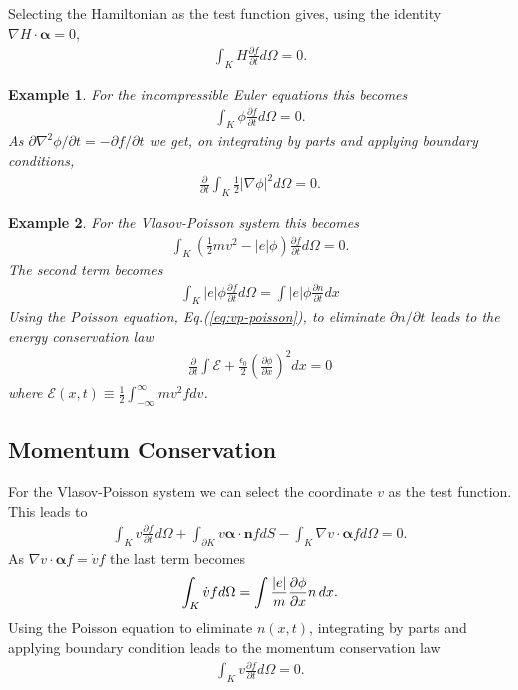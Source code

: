 \documentclass[11pt, reqno]{amsart}
\newcommand{\eqr}[1]{Eq.\thinspace(#1)}
\newcommand{\pfrac}[2]{\frac{\partial #1}{\partial #2}}
\newcommand{\pfraca}[1]{\frac{\partial}{\partial #1}}
\newcommand{\mvec}[1]{\mathbf{#1}}
\newcommand{\gvec}[1]{\boldsymbol{#1}}
\newtheorem{example}{Example}
\theoremstyle{definition}
\begin{document}
Selecting the Hamiltonian as the test function gives, using the
identity $\nabla H \cdot \gvec{\alpha} = 0$,
\begin{align}
  \int_K H \pfrac{f}{t}d\Omega = 0.
\end{align}

\begin{example}
  For the incompressible Euler equations this becomes
  \begin{align}
    \int_K \phi \pfrac{f}{t}d\Omega = 0.
  \end{align}
  As ${\partial \nabla^2 \phi}/{\partial t} = -\partial f/{\partial
    t}$ we get, on integrating by parts and applying boundary
  conditions,
  \begin{align}
    \pfraca{t}\int_K \frac{1}{2} |\nabla\phi|^2  d\Omega = 0.
  \end{align}
\end{example}

\begin{example}
  For the Vlasov-Poisson system this becomes
  \begin{align}
    \int_K \left(\frac{1}{2}mv^2 - |e|\phi\right) \pfrac{f}{t}d\Omega = 0.
  \end{align}
  The second term becomes
  \begin{align}
    \int_K |e|\phi \pfrac{f}{t}d\Omega = \int |e|\phi \pfrac{n}{t} dx
  \end{align}
  Using the Poisson equation, \eqr{\ref{eq:vp-poisson}}, to eliminate
  ${\partial n}/{\partial t}$ leads to the energy conservation law
  \begin{align}
    \pfraca{t}\int \mathcal{E} +
    \frac{\epsilon_0}{2}\left(\pfrac{\phi}{x}\right)^2 dx = 0
  \end{align}
  where $\mathcal{E}(x,t) \equiv \frac{1}{2}\int_{-\infty}^{\infty} mv^2f dv$.
\end{example}

\subsection{Momentum Conservation}

For the Vlasov-Poisson system we can select the coordinate $v$ as the
test function. This leads to
\begin{align}
  \int_K v\pfrac{f}{t}d\Omega 
  + \int_{\partial K}v \gvec{\alpha}\cdot\mvec{n}f dS
  - \int_K \nabla v \cdot \gvec{\alpha} f d\Omega
 = 0.
\end{align}
As $\nabla v \cdot \gvec{\alpha} f = \dot{v}f$ the last term becomes
\begin{align}
  \int_K\dot{v} f d\Omega = \int \frac{|e|}{m} \pfrac{\phi}{x} n\thinspace dx.
\end{align}
Using the Poisson equation to eliminate $n(x,t)$, integrating by parts
and applying boundary condition leads to the momentum conservation law
\begin{align}
  \int_K v\pfrac{f}{t}d\Omega = 0.
\end{align}
\end{document}
